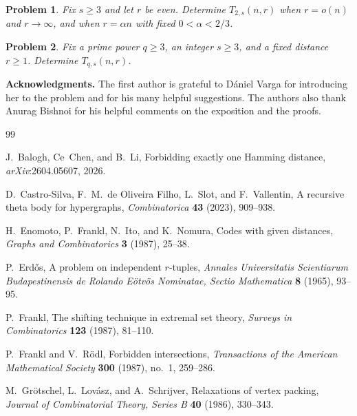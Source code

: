 \documentclass[11pt]{article}
\theoremstyle{plain}
\newtheorem{problem}{Problem}
\begin{document}
\begin{problem}
Fix $s\ge3$ and let $r$ be even. 
Determine $T_{2,s}(n,r)$ when $r=o(n)$ and $r\to\infty$,
and when $r=\alpha n$ with fixed $0<\alpha<2/3$.
\end{problem}

\begin{problem}
Fix a prime power $q\ge3$, an integer $s\ge3$, and a fixed distance
$r\ge1$.  Determine $T_{q,s}(n,r)$.
\end{problem}

\textbf{Acknowledgments.}
The first author is grateful to D\'aniel Varga for introducing her to the problem and for his many helpful suggestions.
The authors also thank Anurag Bishnoi for his helpful comments on the exposition and the proofs.

\begin{thebibliography}{99}

J.~Balogh, Ce~Chen, and B.~Li,
Forbidding exactly one Hamming distance,
\emph{arXiv}:2604.05607, 2026.

D.~Castro-Silva, F.~M.~de Oliveira Filho, L.~Slot, and F.~Vallentin,
A recursive theta body for hypergraphs,
\emph{Combinatorica} \textbf{43} (2023), 909--938.

H.~Enomoto, P.~Frankl, N.~Ito, and K.~Nomura,
Codes with given distances,
\emph{Graphs and Combinatorics} \textbf{3} (1987), 25--38.

P.~Erd\H{o}s,
A problem on independent $r$-tuples,
\emph{Annales Universitatis Scientiarum Budapestinensis de Rolando E\"otv\"os Nominatae, Sectio Mathematica} \textbf{8} (1965), 93--95.

P.~Frankl,
The shifting technique in extremal set theory,
\emph{Surveys in Combinatorics} \textbf{123} (1987), 81--110.

P.~Frankl and V.~R\"odl,
Forbidden intersections,
\emph{Transactions of the American Mathematical Society} \textbf{300} (1987), no.~1, 259--286.

M.~Gr\"otschel, L.~Lov\'asz, and A.~Schrijver,
Relaxations of vertex packing,
\emph{Journal of Combinatorial Theory, Series B} \textbf{40} (1986), 330--343.

\end{thebibliography}
\end{document}
